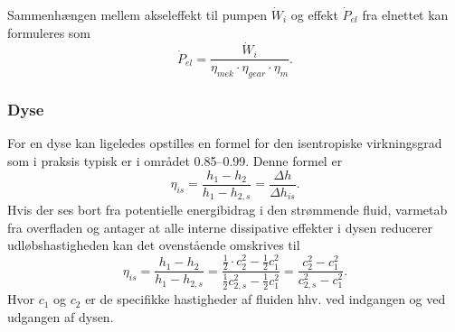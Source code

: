 Sammenhængen mellem akseleffekt til pumpen $\dot{W}_i$ og effekt $\dot{P}_{el}$ fra elnettet kan formuleres som
\[ 
\dot{P}_{el} = \frac{\dot{W}_i}{\eta_{mek} \cdot \eta_{gear}\cdot \eta_{m}}
.\]

\subsubsection{Dyse}
For en dyse kan ligeledes opstilles en formel for den isentropiske virkningsgrad som i praksis typisk er i området \num{0,85}--\num{0,99}. Denne formel er
\[ 
\eta_{is} = \frac{h_1 - h_2}{h_1 - h_{2,s}} = \frac{\Delta h}{\Delta h_{is}}
.\]
Hvis der ses bort fra potentielle energibidrag i den strømmende fluid, varmetab fra overfladen og antager at alle interne dissipative effekter i dysen reducerer udløbshastigheden kan det ovenstående omskrives til
\[ 
\eta_{is} = \frac{h_1 - h_2}{h_1 - h_{2,s}} = \frac{\frac{1}{2} \cdot c_2^2 - \frac{1}{2} c_1^2}{\frac{1}{2} c_{2,s}^2 - \frac{1}{2}c_1^2} = \frac{c_2^2 - c_1^2}{c_{2,s}^2 - c_1^2}
.\]
Hvor $c_1$ og $c_2$ er de specifikke hastigheder af fluiden hhv. ved indgangen og ved udgangen af dysen. 


